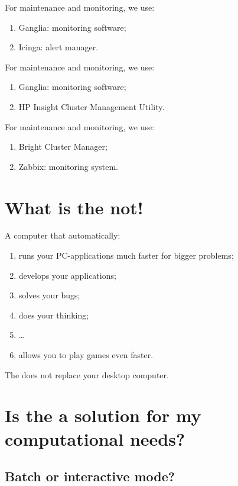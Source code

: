 \ifantwerpen
    For maintenance and monitoring, we use:
    \begin{enumerate}
      \item  Ganglia: monitoring software;
      \item  Icinga: alert manager.
    \end{enumerate}
\fi
\ifleuven
    For maintenance and monitoring, we use:
    \begin{enumerate}
      \item  Ganglia: monitoring software;
      \item  HP Insight Cluster Management Utility.
    \end{enumerate}
\fi
\ifbrussel
    For maintenance and monitoring, we use:
    \begin{enumerate}
      \item  Bright Cluster Manager;
      \item  Zabbix: monitoring system.
    \end{enumerate}
\fi


\section{What is the \hpc not!}
\label{sec:what-is-the-hpc-not}

A computer that automatically:
\begin{enumerate}
  \item  runs your PC-applications much faster for bigger problems;
  \item  develops your applications;
  \item  solves your bugs;
  \item  does your thinking;
  \item  \dots
  \item  allows you to play games even faster.
\end{enumerate}
The \hpc does not replace your desktop computer.

\section{Is the \hpc a solution for my computational needs?}
\label{sec:is-the-hpc-a-solution-for-my-computational-needs}

\subsection{Batch or interactive mode?}
\label{sec:batch-or-interactive-mode}

